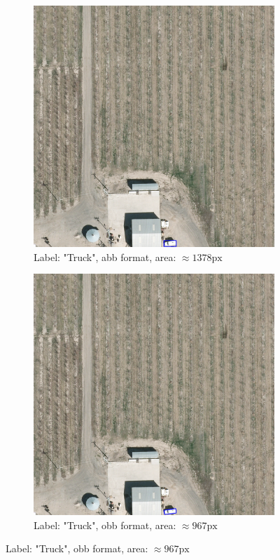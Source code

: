 \begin{figure}[h]
    \centering
    
    \begin{subfigure}[b]{0.45\textwidth}
        \centering
        \includegraphics[width=\textwidth]{images/015Results/01abb_vs_obb/abb_truck.png}
        \caption{Label: "Truck", abb format, area: $\approx 1378 \text{px}$}
        \label{fig:abb_truck_fs}
    \end{subfigure}
    \hfill
    \begin{subfigure}[b]{0.45\textwidth}
        \centering
        \includegraphics[width=\textwidth]{images/015Results/01abb_vs_obb/obb_truck.png}
        \caption{Label: "Truck", obb format, area: $\approx 967 \text{px}$}
        \label{fig:obb_truck_fs}
    \end{subfigure}
    

\end{figure}
